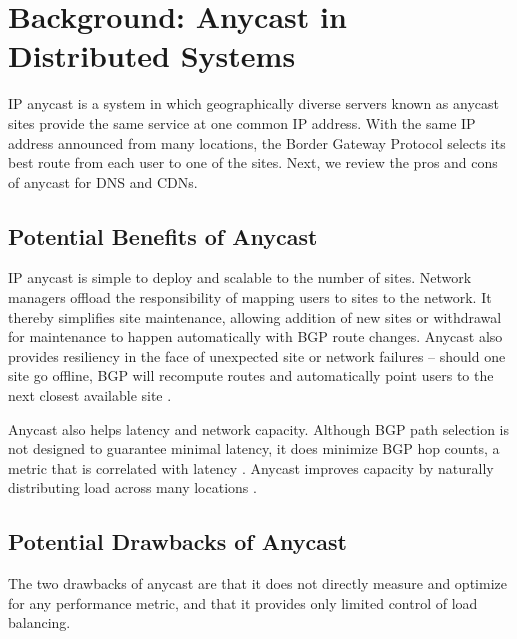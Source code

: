 \documentclass[sigconf,letterpaper,nonacm,10pt,anonymous]{acmart}
\begin{document}
\section{Background: Anycast in Distributed
Systems}\label{background-anycast-in-distributed-systems-1}

\label{sec:anycast_distributed_systems}

IP anycast is a system in which geographically diverse servers known as
anycast sites provide the same service at one common IP address. With
the same IP address announced from many locations, the Border Gateway
Protocol selects its best route from each user to one of the sites.
Next, we review the pros and cons of anycast for DNS and CDNs.

\subsection{Potential Benefits of
Anycast}\label{potential-benefits-of-anycast-1}

\label{sec:bg_potential_benefits}

IP anycast is simple to deploy and scalable to the number of sites.
Network managers offload the responsibility of mapping users to sites to
the network. It thereby simplifies site maintenance, allowing addition
of new sites or withdrawal for maintenance to happen automatically with
BGP route changes. Anycast also provides resiliency in the face of
unexpected site or network failures -- should one site go offline, BGP
will recompute routes and automatically point users to the next closest
available site \cite{metz2002ip}.

Anycast also helps latency and network capacity. Although BGP path
selection is not designed to guarantee minimal latency, it does minimize
BGP hop counts, a metric that is correlated with latency
\cite{de2017anycast}. Anycast improves capacity by naturally
distributing load across many locations \cite{moura2016anycast}.

\subsection{Potential Drawbacks of
Anycast}\label{potential-drawbacks-of-anycast-1}

\label{sec:bg_potential_drawbacks} The two drawbacks of anycast are that
it does not directly measure and optimize for any performance metric,
and that it provides only limited control of load balancing.
\end{document}
